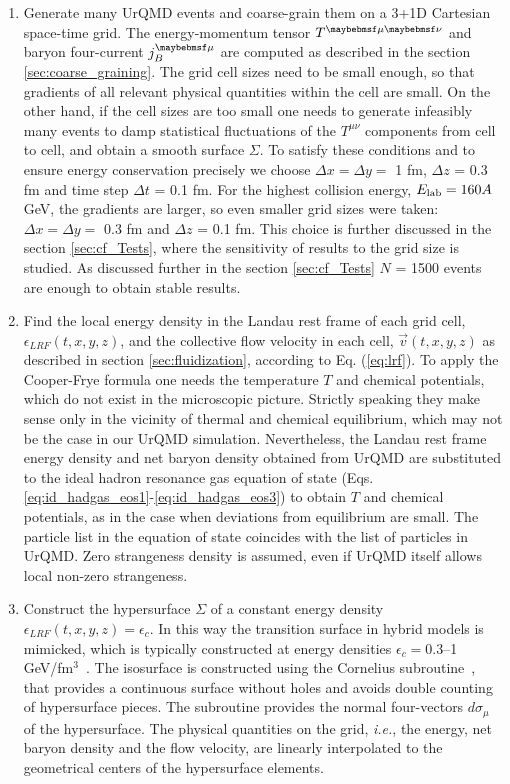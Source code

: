 \begin{enumerate}

\item Generate many UrQMD events and coarse-grain them on a 3+1D Cartesian
  space-time grid. The energy-momentum tensor $\Tmn$ and baryon four-current $\jmu_B$
  are computed as described in the section \ref{sec:coarse_graining}.  The grid
  cell sizes need to be small enough, so that gradients of all relevant physical
  quantities within the cell are small. On the other hand, if the cell sizes are
  too small one needs to generate infeasibly many events to damp statistical
  fluctuations of the $T^{\mu \nu}$ components from cell to cell, and obtain a smooth
  surface $\Sigma$. To satisfy these conditions and to ensure energy conservation
  precisely we choose $\Delta x = \Delta y = $ 1 fm, $\Delta z$ = 0.3 fm and time
  step $\Delta t$ = 0.1 fm. For the highest collision energy, $E_\mathrm{lab} =
  160A$ GeV, the gradients are larger, so even smaller grid sizes were taken:
  $\Delta x = \Delta y = $ 0.3 fm and $\Delta z$ = 0.1 fm. This choice is further
  discussed in the section \ref{sec:cf_Tests}, where the sensitivity of results
  to the grid size is studied. As discussed further in the section \ref{sec:cf_Tests}
  $N$ = 1500 events are enough to obtain stable results.

\item Find the local energy density in the Landau rest frame of each grid cell,
  $\epsilon_{LRF}(t,x,y,z)$, and the collective flow velocity in each cell,
  $\vec{v}(t,x,y,z)$ as described in section \ref{sec:fluidization}, according to
  Eq. (\ref{eq:lrf}).  To apply the Cooper-Frye formula one needs the temperature
  $T$ and chemical potentials, which do not exist in the microscopic picture.
  Strictly speaking they make sense only in the vicinity of thermal and chemical
  equilibrium, which may not be the case in our UrQMD simulation. Nevertheless,
  the Landau rest frame energy density and net baryon density obtained from UrQMD
  are substituted to the ideal hadron resonance gas equation of state (Eqs.
  \ref{eq:id_hadgas_eos1}-\ref{eq:id_hadgas_eos3}) to obtain $T$ and chemical
  potentials, as in the case when deviations from equilibrium are small.  The
  particle list in the equation of state coincides with the list of particles in
  UrQMD. Zero strangeness density is assumed, even if UrQMD itself allows local
  non-zero strangeness.

\item Construct the hypersurface $\Sigma$ of a constant energy density
  $\epsilon_{LRF}(t,x,y,z) = \epsilon_c$.  In this way the transition surface
  in hybrid models is mimicked, which is typically constructed at energy densities
  $\epsilon_c = 0.3$--1 GeV/fm$^3$~\cite{Huovinen:2012is}.  The isosurface is
  constructed using the Cornelius subroutine~\cite{Huovinen:2012is}, that provides a
  continuous surface without holes and avoids double counting of hypersurface pieces.
  The subroutine provides the normal four-vectors $d\sigma_{\mu}$ of the hypersurface.
  The physical quantities on the grid, \emph{i.e.}, the energy, net baryon density
  and the flow velocity, are linearly interpolated to the geometrical centers of
  the hypersurface elements.


\end{enumerate}
